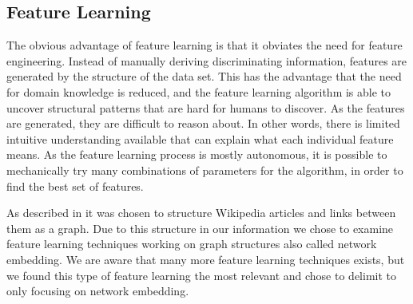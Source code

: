 \subsection{Feature Learning}
The obvious advantage of feature learning is that it obviates the need for feature engineering. Instead of manually deriving discriminating information, features are generated by the structure of the data set. This has the advantage that the need for domain knowledge is reduced, and the feature learning algorithm is able to uncover structural patterns that are hard for humans to discover. As the features are generated, they are difficult to reason about. In other words, there is limited intuitive understanding available that can explain what each individual feature means. As the feature learning process is mostly autonomous, it is possible to mechanically try many combinations of parameters for the algorithm, in order to find the best set of features.

As described in  it was chosen to structure Wikipedia articles and links between them as a graph. Due to this structure in our information we chose to examine feature learning techniques working on graph structures also called network embedding.
We are aware that many more feature learning techniques exists, but we found this type of feature learning the most relevant and chose to delimit to only focusing on network embedding.

